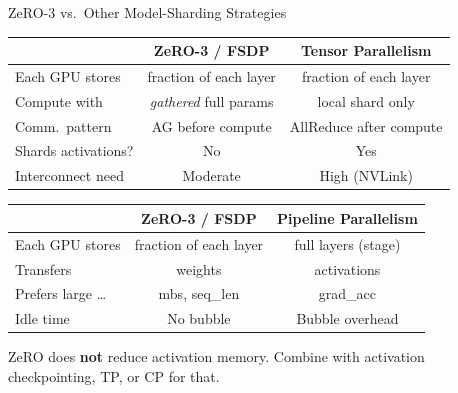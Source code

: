 \begin{frame}{ZeRO-3 vs.\ Other Model-Sharding Strategies}

  \begin{center}
  \renewcommand{\arraystretch}{1.3}
  \begin{tabular}{lcc}
    \toprule
    & \textbf{ZeRO-3 / FSDP} & \textbf{Tensor Parallelism} \\
    \midrule
    Each GPU stores & fraction of each layer & fraction of each layer \\
    Compute with & \emph{gathered} full params & local shard only \\
    Comm.\ pattern & AG before compute & AllReduce after compute \\
    Shards activations? & No & Yes \\
    Interconnect need & Moderate & High (NVLink) \\
    \bottomrule
  \end{tabular}
  \end{center}

  \vspace{0.5em}
  \begin{center}
  \renewcommand{\arraystretch}{1.3}
  \begin{tabular}{lcc}
    \toprule
    & \textbf{ZeRO-3 / FSDP} & \textbf{Pipeline Parallelism} \\
    \midrule
    Each GPU stores & fraction of each layer & full layers (stage) \\
    Transfers & weights & activations \\
    Prefers large \ldots & mbs, seq\_len & grad\_acc \\
    Idle time & No bubble & Bubble overhead \\
    \bottomrule
  \end{tabular}
  \end{center}

  \vspace{0.3em}
  {\small ZeRO does \textbf{not} reduce activation memory. Combine with activation checkpointing, TP, or CP for that.}
\end{frame}
